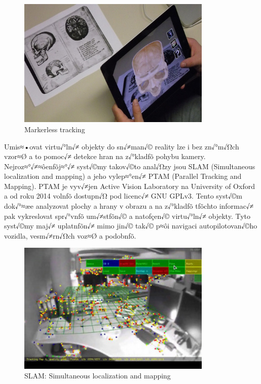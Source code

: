 \documentclass[twoside,12pt]{article}
\begin{document}
\begin{figure}[H]
    \includegraphics[width=350px, center]{images/markerless-tracking.jpg}
    \caption{Markerless tracking}
    \label{markerless_tracking}
\end{figure}

Umis≈•ovat virtu√°ln√≠ objekty do sn√≠man√© reality lze i bez zn√°m√Ωch vzor≈Ø a to pomoc√≠ detekce hran na z√°kladƒõ pohybu kamery. Nejroz≈°√≠≈ôenƒõj≈°√≠ syst√©my takov√©to anal√Ωzy jsou SLAM (Simultaneous localization and mapping) a jeho vylep≈°en√≠ PTAM (Parallel Tracking and Mapping). PTAM je vyv√≠jen Active Vision Laboratory na University of Oxford a od roku 2014 volnƒõ dostupn√Ω pod licenc√≠ GNU GPLv3. Tento syst√©m dok√°≈æe analyzovat plochy a hrany v obrazu a na z√°kladƒõ tƒõchto informac√≠ pak vykreslovat spr√°vnƒõ um√≠stƒõn√© a natoƒçen√© virtu√°ln√≠ objekty. Tyto syst√©my maj√≠ uplatnƒõn√≠ mimo jin√© tak√© p≈ôi navigaci autopilotovan√©ho vozidla, vesm√≠rn√Ωch voz≈Ø a podobnƒõ.

\begin{figure}[H]
    \includegraphics[width=350px, center]{images/slam.jpg}
    \caption{SLAM: Simultaneous localization and mapping}
    \label{slam}
\end{figure}


%
%
\end{document}
